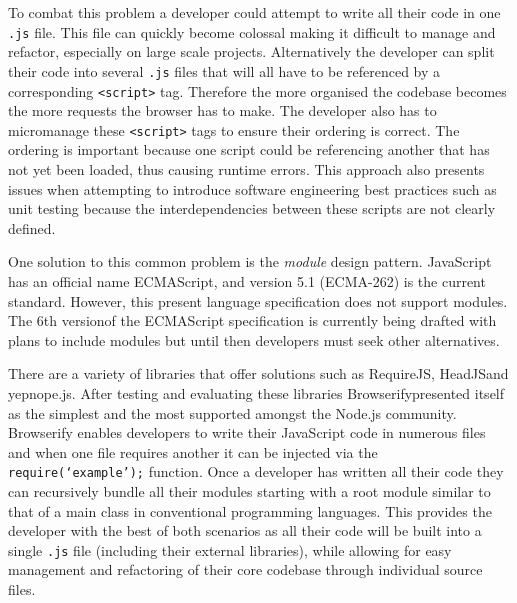 \documentclass[final]{cmpreport}
\begin{document}
To combat this problem a developer could attempt to write all their code in one \texttt{.js} file. This file can quickly become colossal making it difficult to manage and refactor, especially on large scale projects. Alternatively the developer can split their code into several \texttt{.js} files that will all have to be referenced by a corresponding \texttt{<script>} tag. Therefore the more organised the codebase becomes the more requests the browser has to make. The developer also has to micromanage these \texttt{<script>} tags to ensure their ordering is correct. The ordering is important because one script could be referencing another that has not yet been loaded, thus causing runtime errors. This approach also presents issues when attempting to introduce software engineering best practices such as unit testing because the interdependencies between these scripts are not clearly defined.

One solution to this common problem is the \textit{module} design pattern. JavaScript has an official name ECMAScript, and version 5.1 (ECMA-262\footnotemark) is the current standard. However, this present language specification does not support modules. The 6th version\footnotemark of the ECMAScript specification is currently being drafted with plans to include modules but until then developers must seek other alternatives.


There are a variety of libraries that offer solutions such as RequireJS\footnotemark, HeadJS\footnotemark and yepnope.js\footnotemark. After testing and evaluating these libraries Browserify\footnotemark presented itself as the simplest and the most supported amongst the Node.js community. Browserify enables developers to write their JavaScript code in numerous files and when one file requires another it can be injected via the \texttt{require(`example');} function. Once a developer has written all their code they can recursively bundle all their modules starting with a root module similar to that of a main class in conventional programming languages. This provides the developer with the best of both scenarios as all their code will be built into a single \texttt{.js} file (including their external libraries), while allowing for easy management and refactoring of their core codebase through individual source files.

\end{document}
